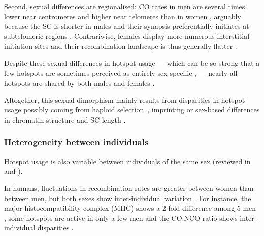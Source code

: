 Second, sexual differences are regionalised: CO rates in men are several times lower near centromeres and higher near telomeres than in women \citep[reviewed in][]{buard2007playing}, arguably because the SC is shorter in males \citep{tease2004intersex} and their synapsis preferentially initiates at subtelomeric regions \citep{brown2005meiotic}.
Contrariwise, females display more numerous interstitial initiation sites and their recombination landscape is thus generally flatter \citep{paigen2008recombinational}.

Despite these sexual differences in hotspot usage — which can be so strong that a few hotspots are sometimes perceived as entirely sex-specific \citep{shiroishi1990recombinational,shiroishi1991genetic}, — nearly all hotspots are shared by both males and females \citep{bherer2017refined}.


Altogether, this sexual dimorphism mainly results from disparities in hotspot usage \citep{brick2018extensive} possibly coming from haploid selection \citep{lenormand2005recombination}, imprinting \citep{lercher2003imprinted} or sex-based differences in chromatin structure \citep{gerton2005homologous} and SC length \citep{petkov2007crossover}.


\subsubsection{Heterogeneity between individuals}

Hotspot usage is also variable between individuals of the same sex (reviewed in \citealp{popa2011evolution} and \citealp{capilla2016mammalian}).

In humans, fluctuations in recombination rates are greater between women than between men, but both sexes show inter-individual variation \citep{cheung2007polymorphic}.
For instance, the major histocompatibility complex (MHC) shows a 2-fold difference among 5 men \citep{yu1996individual}, some hotspots are active in only a few men \citep{neumann2006polymorphism} and the CO:NCO ratio shows inter-individual disparities \citep{jeffreys2005factors,sarbajna2012major}.

